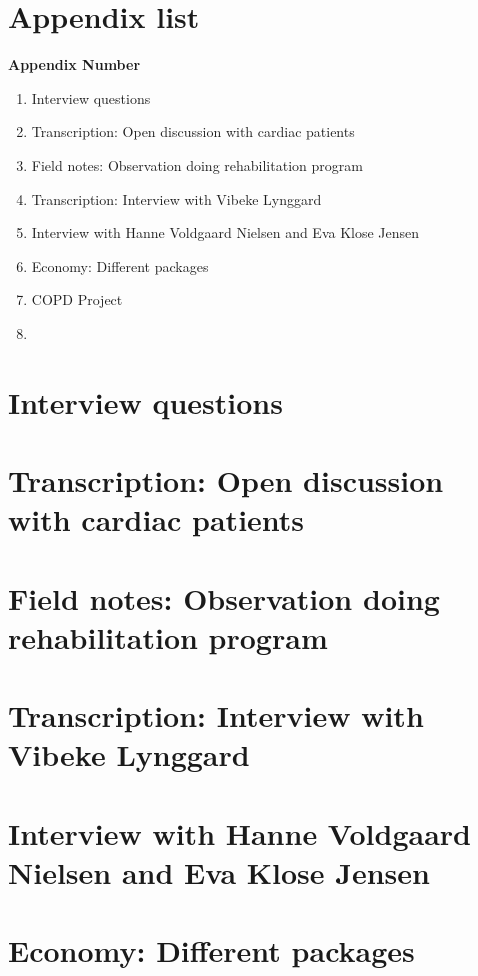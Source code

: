 \chapter{Appendix list}

\textbf{Appendix Number}
\begin{enumerate}
	\item Interview questions
	\item Transcription: Open discussion with cardiac patients
	\item Field notes: Observation doing rehabilitation program
	\item Transcription: Interview with Vibeke Lynggard
	\item Interview with Hanne Voldgaard Nielsen and Eva Klose Jensen
	\item Economy: Different packages
	\item COPD Project
	\item 
\end{enumerate}



\chapter{Interview questions} \label{interviewquestion}

\chapter{Transcription: Open discussion with cardiac patients}

\chapter{Field notes: Observation doing rehabilitation program}

\chapter{Transcription: Interview with Vibeke Lynggard}

\chapter{Interview with Hanne Voldgaard Nielsen and Eva Klose Jensen}

\chapter{Economy: Different packages} \label{economics}

